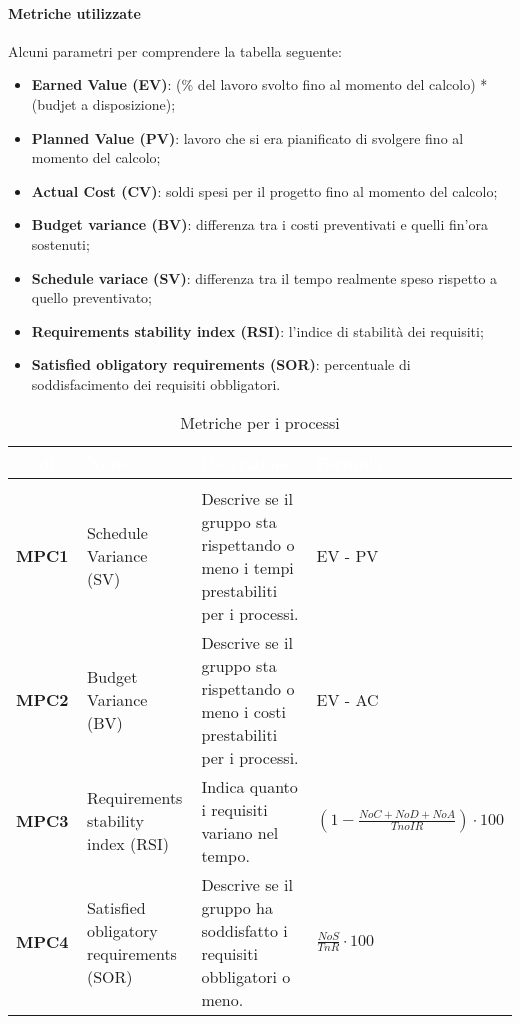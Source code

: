 \paragraph{Metriche utilizzate}
Alcuni parametri per comprendere la tabella seguente:
\begin{itemize}
	\item \textbf{Earned Value (EV)}: (\% del lavoro svolto fino al momento del calcolo) * (budjet a disposizione);
	\item \textbf{Planned Value (PV)}: lavoro che si era pianificato di svolgere fino al momento del calcolo;
	\item \textbf{Actual Cost (CV)}: soldi spesi per il progetto fino al momento del calcolo;
	\item \textbf{Budget variance (BV)}: differenza tra i costi preventivati e quelli fin'ora sostenuti;
	\item \textbf{Schedule variace (SV)}: differenza tra il tempo realmente speso rispetto a quello preventivato;
	\item \textbf{Requirements stability index (RSI)}: l'indice di stabilità dei requisiti;
	\item \textbf{Satisfied obligatory requirements (SOR)}: percentuale di soddisfacimento dei requisiti obbligatori.
\end{itemize}

\renewcommand{\arraystretch}{1.5}
\renewcommand\extrarowheight{1.5pt}
\begin{longtable}{C{1.5cm} | C{4.5cm} C{5.5cm} C{4.5cm}}
		\textcolor{white}{\textbf{Codice}} & 
		\textcolor{white}{\textbf{Nome}} & 
		\textcolor{white}{\textbf{Descrizione}} & 
		\textcolor{white}{\textbf{Formula}} \\
		\endfirsthead
		\\
	    \endfoot
	    \caption{Metriche per i processi}
	    \endlastfoot
		\hline
		\textbf{MPC1} & 
		Schedule Variance (SV)  & 
		Descrive se il gruppo sta rispettando o meno i tempi prestabiliti per i processi. & 
		EV - PV \\
		\textbf{MPC2} & 
		Budget Variance (BV) & 
		Descrive se il gruppo sta rispettando o meno i costi prestabiliti per i processi. & 
		EV - AC \\
		\textbf{MPC3} &
		Requirements stability index (RSI) &
		Indica quanto i requisiti variano nel tempo. &
		$(1 - \frac{NoC + NoD + NoA}{TnoIR}) \cdot 100$ \\
		\textbf{MPC4} &
		Satisfied obligatory requirements (SOR) &
		Descrive se il gruppo ha soddisfatto i requisiti obbligatori o meno. &
		$\frac{NoS}{TnR} \cdot 100$ \\ 
\end{longtable}

